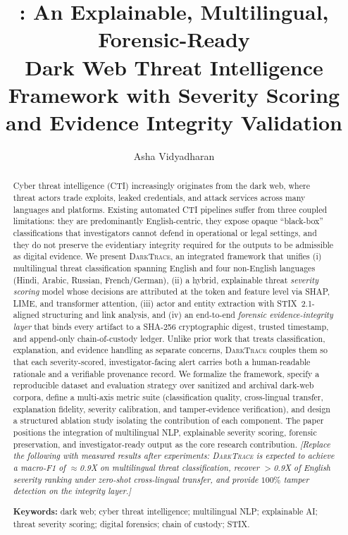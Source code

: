 \documentclass[11pt,a4paper]{article}
\title{\framework{}: An Explainable, Multilingual, Forensic-Ready\\
Dark Web Threat Intelligence Framework with Severity Scoring\\
and Evidence Integrity Validation}
\author[1]{Asha Vidyadharan}
\affil[1]{\small Affiliation to be completed. Corresponding author: \texttt{codeasasha@gmail.com}}
\date{}
\newcommand{\framework}{\textsc{DarkTrace}}
\begin{document}
\maketitle

\begin{abstract}
\noindent
Cyber threat intelligence (CTI) increasingly originates from the dark web, where
threat actors trade exploits, leaked credentials, and attack services across many
languages and platforms. Existing automated CTI pipelines suffer from three coupled
limitations: they are predominantly English-centric, they expose opaque
``black-box'' classifications that investigators cannot defend in operational or legal
settings, and they do not preserve the evidentiary integrity required for the outputs
to be admissible as digital evidence. We present \framework{}, an integrated framework
that unifies (i) multilingual threat classification spanning English and four
non-English languages (Hindi, Arabic, Russian, French/German), (ii) a hybrid,
explainable threat \emph{severity scoring} model whose decisions are attributed at the
token and feature level via SHAP, LIME, and transformer attention, (iii) actor and
entity extraction with STIX~2.1-aligned structuring and link analysis, and (iv) an
end-to-end \emph{forensic evidence-integrity layer} that binds every artifact to a
SHA-256 cryptographic digest, trusted timestamp, and append-only chain-of-custody
ledger. Unlike prior work that treats classification, explanation, and evidence
handling as separate concerns, \framework{} couples them so that each severity-scored,
investigator-facing alert carries both a human-readable rationale and a verifiable
provenance record. We formalize the framework, specify a reproducible dataset and
evaluation strategy over sanitized and archival dark-web corpora, define a multi-axis
metric suite (classification quality, cross-lingual transfer, explanation fidelity,
severity calibration, and tamper-evidence verification), and design a structured
ablation study isolating the contribution of each component. The paper positions the
integration of multilingual NLP, explainable severity scoring, forensic preservation,
and investigator-ready output as the core research contribution. \emph{[Replace the
following with measured results after experiments: \framework{} is expected to achieve
a macro-F1 of $\approx$0.9X on multilingual threat classification, recover $>$0.9X of
English severity ranking under zero-shot cross-lingual transfer, and provide $100\%$
tamper detection on the integrity layer.]}

\vspace{0.6em}
\noindent\textbf{Keywords:} dark web; cyber threat intelligence; multilingual NLP;
explainable AI; threat severity scoring; digital forensics; chain of custody; STIX.
\end{abstract}
\end{document}
